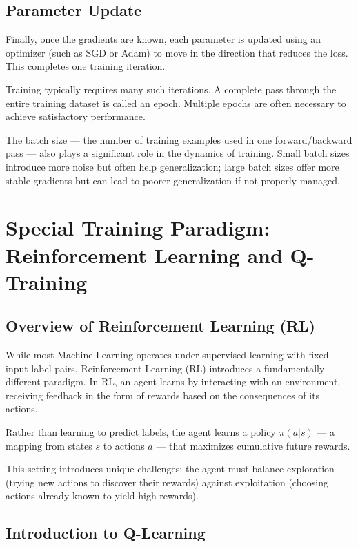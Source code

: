 \documentclass[openany]{book}
\begin{document}
\subsection{Parameter Update}

Finally, once the gradients are known, each parameter is updated using an 
optimizer (such as SGD or Adam) to move in the direction that reduces the loss.
This completes one training iteration.

Training typically requires many such iterations. A complete pass through the 
entire training dataset is called an epoch. Multiple epochs are often necessary 
to achieve satisfactory performance.

The batch size — the number of training examples used in one forward/backward 
pass — also plays a significant role in the dynamics of training. Small batch 
sizes introduce more noise but often help generalization; large batch sizes 
offer more stable gradients but can lead to poorer generalization if not 
properly managed.

\section{Special Training Paradigm: Reinforcement Learning and Q-Training}

\subsection{Overview of Reinforcement Learning (RL)}

While most Machine Learning operates under supervised learning with fixed 
input-label pairs, Reinforcement Learning (RL) introduces a fundamentally 
different paradigm. In RL, an agent learns by interacting with an environment, 
receiving feedback in the form of rewards based on the consequences of its 
actions.

Rather than learning to predict labels, the agent learns a policy $\pi(a|s)$ — a 
mapping from states $s$ to actions $a$ — that maximizes cumulative future 
rewards.

This setting introduces unique challenges: the agent must balance exploration 
(trying new actions to discover their rewards) against exploitation (choosing 
actions already known to yield high rewards).

\subsection{Introduction to Q-Learning}
\end{document}
